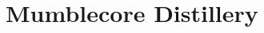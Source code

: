 \documentclass[class=myArticleClass, float=false, crop=false]{standalone}
\begin{document}
\section{Mumblecore Distillery}
\label{aMD}
\end{document}
